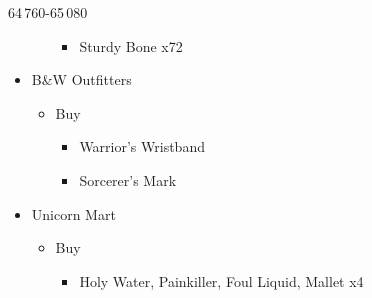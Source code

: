 \begin{shop}{64\,760-65\,080}
\begin{itemize}
\begin{itemize}
\begin{itemize}
					            \item Sturdy Bone x72
				            \end{itemize}
			      \end{itemize}
			\item B\&W Outfitters
			      \begin{itemize}
				      \item Buy
				            \begin{itemize}
					            \item Warrior's Wristband
					            \item Sorcerer's Mark
				            \end{itemize}
			      \end{itemize}
			\item Unicorn Mart
			      \begin{itemize}
				      \item Buy
				            \begin{itemize}
					            \item Holy Water, Painkiller, Foul Liquid, Mallet x4
				            \end{itemize}
			      \end{itemize}
		\end{itemize}
	\end{shop}

